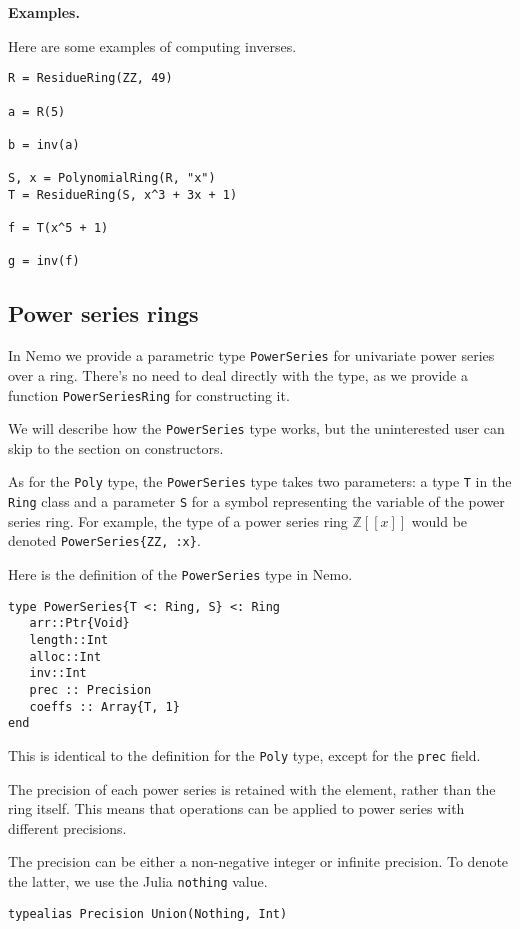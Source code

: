 \documentclass[a4paper,10pt]{article}
\newcommand{\Z}{\mathbb{Z}}
\newcommand{\code}{\lstinline}
\begin{document}
{{\textbf{Examples.}

Here are some examples of computing inverses.

\begin{lstlisting}
R = ResidueRing(ZZ, 49)

a = R(5)

b = inv(a)

S, x = PolynomialRing(R, "x")
T = ResidueRing(S, x^3 + 3x + 1)

f = T(x^5 + 1)

g = inv(f)
\end{lstlisting}

\subsection{Power series rings}

In Nemo we provide a parametric type \code{PowerSeries} for univariate power
series over a ring. There's no need to deal directly with the type, as we
provide a function \code{PowerSeriesRing} for constructing it.

We will describe how the \code{PowerSeries} type works, but the uninterested
user can skip to the section on constructors.

As for the \code{Poly} type, the \code{PowerSeries} type takes two parameters:
a type \code{T} in the \code{Ring} class and a parameter \code{S} for a symbol
representing the variable of the power series ring. For example, the type of
a power series ring $\Z[[x]]$ would be denoted \code|PowerSeries{ZZ, :x}|.

Here is the definition of the \code{PowerSeries} type in Nemo.

\begin{lstlisting}
type PowerSeries{T <: Ring, S} <: Ring
   arr::Ptr{Void}
   length::Int
   alloc::Int
   inv::Int
   prec :: Precision
   coeffs :: Array{T, 1}
end
\end{lstlisting}

This is identical to the definition for the \code{Poly} type, except for the
\code{prec} field.

The precision of each power series is retained with the element, rather than
the ring itself. This means that operations can be applied to power series
with different precisions.

The precision can be either a non-negative integer or infinite precision. To
denote the latter, we use the Julia \code{nothing} value.

\begin{lstlisting}
typealias Precision Union(Nothing, Int)
\end{lstlisting}

}}
\end{document}
